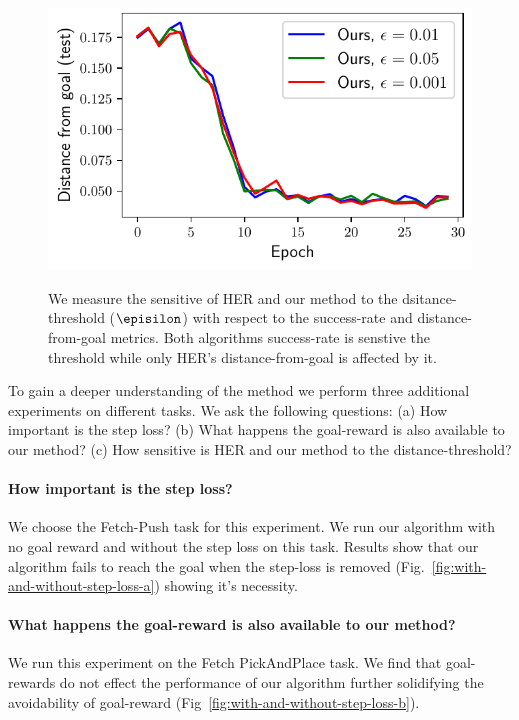 \begin{figure}
\begin{minipage}[b]{\frac\linewidth}
  \includegraphics[width=\frac\columnwidth]{media/res/ablate-ddpg-dqst-low_tresh_chosen-low_thresh_alt-dqst/0.001-FetchPushPR-be467dfepoch-test/ag_g_dist.pdf}%
  \label{fig:distance}
\end{minipage}
  \caption{We measure the sensitive of HER and our method to the
    dsitance-threshold ($\episilon$) with respect to the success-rate
    and distance-from-goal metrics. Both algorithms success-rate is
    senstive the threshold while only HER's distance-from-goal is
    affected by it. 
}%
  \label{fig:with-different-distance-thresholds}%
\end{figure}%
% 

To gain a deeper understanding of the method we perform three additional
experiments on different tasks. We ask the following questions:
(a) How important is the step loss?
(b) What happens the goal-reward is also available to our method?
(c) How sensitive is HER and our method to the distance-threshold?
\paragraph{How important is the step loss?}
%
We choose the Fetch-Push task for this experiment.
We run our algorithm with no goal reward and without the step loss on
this task. Results show that our algorithm fails to reach the goal when the
step-loss is removed (Fig.~\ref{fig:with-and-without-step-loss-a})
showing it's necessity.

\paragraph{What happens the goal-reward is also available to our method?}
We run this experiment on the Fetch PickAndPlace task. We find that
goal-rewards do not effect the performance of our algorithm further
solidifying the avoidability of goal-reward
(Fig~\ref{fig:with-and-without-step-loss-b}).

